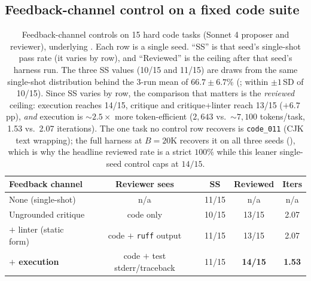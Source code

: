\subsection{Feedback-channel control on a fixed code suite}
\begin{table}[H]
\centering
\caption{Feedback-channel controls on 15 hard code tasks (Sonnet 4 proposer and reviewer), underlying . Each row is a single seed. ``SS'' is that seed's single-shot pass rate (it varies by row), and ``Reviewed'' is the ceiling after that seed's harness run. The three SS values (10/15 and 11/15) are draws from the same single-shot distribution behind the 3-run mean of $66.7 \pm 6.7$\% (; within $\pm 1$\,SD of 10/15). Since SS varies by row, the comparison that matters is the \emph{reviewed} ceiling: execution reaches 14/15, critique and critique+linter reach 13/15 ($+6.7$\,pp), \emph{and} execution is ${\sim}2.5\times$ more token-efficient ($2{,}643$ vs.\ ${\sim}7{,}100$ tokens/task, 1.53 vs.\ 2.07 iterations). The one task no control row recovers is \texttt{code\_011} (CJK text wrapping); the full harness at $B{=}20$K recovers it on all three seeds (), which is why the headline reviewed rate is a strict $100\%$ while this leaner single-seed control caps at $14/15$.}
\label{tab:type-controls}
\small
\begin{tabular}{lcccc}
\toprule
Feedback channel & Reviewer sees & SS & Reviewed & Iters \\
\midrule
None (single-shot)             & n/a                                  & 11/15 & n/a            & n/a \\
Ungrounded critique            & code only                            & 10/15 & 13/15          & 2.07 \\
$+$ linter (static form)       & code $+$ \texttt{ruff} output        & 11/15 & 13/15          & 2.07 \\
\textbf{$+$ execution}         & code $+$ test stderr/traceback       & 11/15 & \textbf{14/15} & \textbf{1.53} \\
\bottomrule
\end{tabular}
\end{table}

